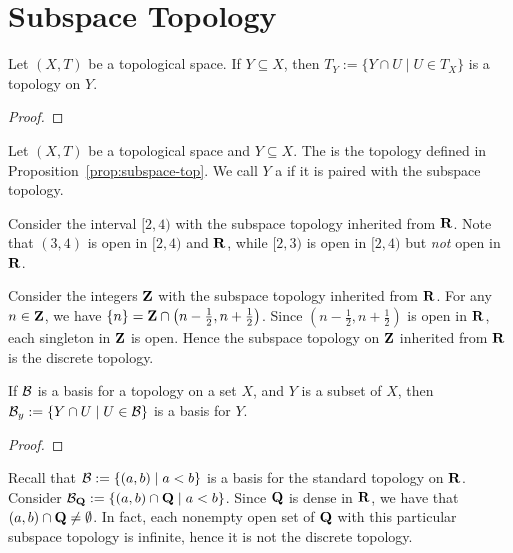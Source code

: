 \section{Subspace Topology}

\begin{proposition}\label{prop:subspace-top}
    Let $(X,T)$ be a topological space. If $Y \subseteq X$, then $T_Y := \{Y \cap U \mid U \in T_X\}$ is a topology on $Y$.
\end{proposition}
    {\color{red} \begin{proof}
        
    \end{proof}}

\begin{definition}
    Let $(X,T)$ be a topological space and $Y \subseteq X$. The  is the topology defined in Proposition~\ref{prop:subspace-top}. We call $Y$ a  if it is paired with the subspace topology.
\end{definition}

\begin{example}
    Consider the interval $[2,4)$ with the subspace topology inherited from $\mathbf{R}$. Note that $(3,4)$ is open in $[2,4)$ and $\mathbf{R}$, while $[2,3)$ is open in $[2,4)$ but \textit{not} open in $\mathbf{R}$.
\end{example}

\begin{example}
    Consider the integers $\mathbf{Z}$ with the subspace topology inherited from $\mathbf{R}$. For any $n \in \mathbf{Z}$, we have $\{n\} = \mathbf{Z} \cap \left( n - \frac{1}{2}, n+ \frac{1}{2} \right)$. Since $\left( n - \frac{1}{2}, n+ \frac{1}{2} \right)$ is open in $\mathbf{R}$, each singleton in $\mathbf{Z}$ is open. Hence the subspace topology on $\mathbf{Z}$ inherited from $\mathbf{R}$ is the discrete topology.
\end{example}

\begin{proposition}
    If $\mathcal{B}$ is a basis for a topology on a set $X$, and $Y$ is a subset of $X$, then $\mathcal{B}_y := \{Y \cap U \mid U \in \mathcal{B}\}$ is a basis for $Y$.
\end{proposition}
    {\color{red} \begin{proof}
        
    \end{proof}}

\begin{example}
    Recall that $\mathcal{B} := \{(a,b) \mid a < b\}$ is a basis for the standard topology on $\mathbf{R}$. Consider $\mathcal{B}_{\mathbf{Q}} := \{(a,b) \cap \mathbf{Q} \mid a < b\}$. Since $\mathbf{Q}$ is dense in $\mathbf{R}$, we have that $(a,b) \cap \mathbf{Q} \neq \emptyset$. In fact, each nonempty open set of $\mathbf{Q}$ with this particular subspace topology is infinite, hence it is not the discrete topology.
\end{example}

